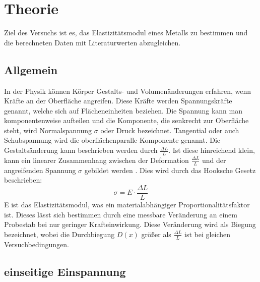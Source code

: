 \section{Theorie}
\label{sec:Theorie}

Ziel des Versuchs ist es, das Elastizitätsmodul eines Metalls zu bestimmen und die berechneten Daten mit Literaturwerten abzugleichen.


\subsection{Allgemein}
In der Physik können Körper Gestalts- und Volumenänderungen erfahren, wenn Kräfte an der Oberfläche angreifen. Diese Kräfte werden Spannungskräfte genannt, welche sich auf Flächeneinheiten beziehen.
Die Spannung kann man komponentenweise aufteilen und die Komponente, die senkrecht zur Oberfläche steht, wird Normalspannung $\sigma$ oder Druck bezeichnet.
Tangential oder auch Schubspannung wird die oberflächenparalle Komponente genannt.
Die Gestaltsänderung kann beschrieben werden durch $\frac{\Delta L}{L}$. 
Ist diese hinreichend klein, kann ein linearer Zusammenhang zwischen der Deformation $\frac{\Delta L}{L}$ und der angreifenden Spannung $\sigma$ gebildet werden \cite[106]{V103}.  Dies wird durch das Hooksche Gesetz beschrieben:
\begin{equation}
  \sigma = E \cdot \frac{\Delta L}{L}
  \label{eqn:Hook}
\end{equation}
E ist das Elastizitätsmodul, was ein materialabhängiger Proportionalitätsfaktor ist.
Dieses lässt sich bestimmen durch eine messbare Veränderung an einem Probestab bei nur geringer Krafteinwirkung. 
Diese Veränderung wird als Biegung bezeichnet, wobei die Durchbiegung $D(x)$ größer als $\frac{\Delta L}{L}$ ist bei gleichen Versuchbedingungen.


\subsection{einseitige Einspannung}

